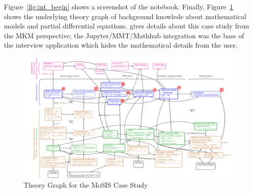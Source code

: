 Figure~\ref{fig:int_begin} shows a screenshot of the notebook.
Finally, Figure~\ref{fig:pde-theory} shows the underlying theory graph of background knowlede about mathematical models and partial differential equations. \cite{PolKohKoe:kacse18} gives details about this case study from the MKM perspective; the Jupyter/MMT/Mathhub integration was the base of the interview application which hides the mathematical details from the user.  

\begin{figure}[h!p]\centering
  \begin{turn}{-90}\includegraphics[width=0.95\textheight]{pde-theory}\end{turn}
  \caption{Theory Graph for the MoSIS Case Study}\label{fig:pde-theory}
\end{figure}


